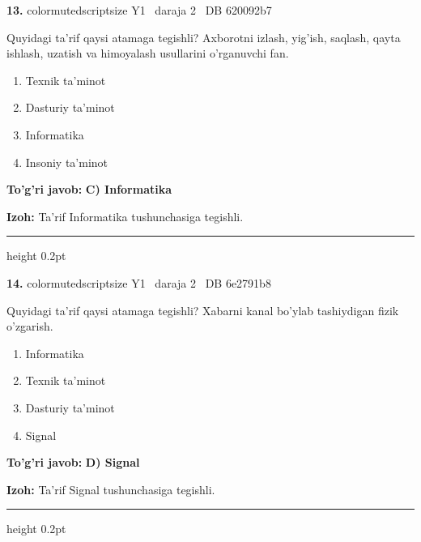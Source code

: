\documentclass[10pt,a4paper,oneside]{article}
\begin{document}
\noindent\textbf{\color{ink}13.}  {color{muted}scriptsize Y1 \textbullet\ daraja 2 \textbullet\ DB 620092b7}
\par
Quyidagi ta'rif qaysi atamaga tegishli? Axborotni izlash, yig'ish, saqlash, qayta ishlash, uzatish va himoyalash usullarini o'rganuvchi fan.
\begin{enumerate}[label=\Alph*),leftmargin=9mm]
\item Texnik ta'minot
\item Dasturiy ta'minot
\item Informatika
\item Insoniy ta'minot
\end{enumerate}
\begin{tcolorbox}[enhanced,breakable,colback=teal!4,colframe=teal!50!black,boxrule=0.5pt,arc=1.1mm,left=3mm,right=3mm,top=1.7mm,bottom=1.7mm,before skip=2mm,after skip=2mm]
\textbf{\color{teal}To'g'ri javob:} \textbf{C) Informatika}
\par\smallskip
\textbf{Izoh:} Ta'rif Informatika tushunchasiga tegishli.
\end{tcolorbox}
\vspace{2mm}\hrule height 0.2pt \vspace{3mm}

\noindent\textbf{\color{ink}14.}  {color{muted}scriptsize Y1 \textbullet\ daraja 2 \textbullet\ DB 6e2791b8}
\par
Quyidagi ta'rif qaysi atamaga tegishli? Xabarni kanal bo'ylab tashiydigan fizik o'zgarish.
\begin{enumerate}[label=\Alph*),leftmargin=9mm]
\item Informatika
\item Texnik ta'minot
\item Dasturiy ta'minot
\item Signal
\end{enumerate}
\begin{tcolorbox}[enhanced,breakable,colback=teal!4,colframe=teal!50!black,boxrule=0.5pt,arc=1.1mm,left=3mm,right=3mm,top=1.7mm,bottom=1.7mm,before skip=2mm,after skip=2mm]
\textbf{\color{teal}To'g'ri javob:} \textbf{D) Signal}
\par\smallskip
\textbf{Izoh:} Ta'rif Signal tushunchasiga tegishli.
\end{tcolorbox}
\vspace{2mm}\hrule height 0.2pt \vspace{3mm}
\end{document}
